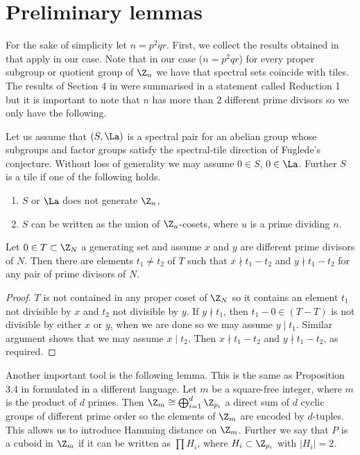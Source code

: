         \section{Preliminary lemmas}
        For the sake of simplicity let $n=p^2qr$.
        First, we collect the results obtained in \cite{negyen} that apply in our case. Note that in our case ($n=p^2qr$) for every proper subgroup or quotient group of $\Z_n$ we have that spectral sets coincide with tiles. 
        The results of Section 4 in \cite{negyen} were summarised in a statement called Reduction 1 but it is important to note that $n$ has more than $2$ different prime divisors so we only have the following. 
        \begin{prop}\label{propreduction}
        Let us assume that $(S,\La)$ is a spectral pair for an abelian group whose subgroups and factor groups satisfy the spectral-tile direction of Fuglede's conjecture. Without loss of generality we may assume $0 \in S$, $0 \in \La$. Further $S$ is a tile if one of the following holds. 
        \begin{enumerate}
            \item\label{itemreductiona} $S$ or $\La$ does not generate $\Z_n$, 
            \item\label{itemreductionb} $S$ can be written as the union of $\Z_u$-cosets, where $u$ is a prime dividing $n$.
        \end{enumerate}
        \end{prop}
        \begin{lem}\label{lempqnemoszt}
        Let $0 \in T \subset \Z_N$ a generating set and assume $x$ and $y$ are different prime divisors of $N$. Then there are elements $t_1 \ne t_2$ of $T$ such that $x \nmid t_1-t_2$ and $y \nmid t_1-t_2$ for any pair of prime divisors of $N$.
        \end{lem}
        \begin{proof}
        $T$ is not contained in any proper coset of $\Z_N$ so it contains an element $t_1$ not divisible by $x$ and $t_2$ not divisible by $y$. If $y \nmid t_1$, then $t_1-0 \in (T -T)$ is not divisible by either $x$ or $y$, when we are done so we may assume $y \mid t_1$. 
        Similar argument shows that we may assume $x \mid t_2$. Then $x \nmid t_1-t_2$ and $y \nmid t_1-t_2$, as required. 
        \end{proof}
        Another important tool is the following lemma. This is the same as Proposition 3.4 in \cite{negyen} formulated in a different language. Let $m$ be a square-free integer, where $m$ is the product of $d$ primes. Then $\Z_m \cong \bigoplus_{i=1}^d\Z_{p_i}$ a direct sum of $d$ cyclic groups of different  prime order so the elements of $\Z_m$ are encoded by $d$-tuples. This allows us to introduce Hamming distance on $\Z_m$. Further we say that $P$ is a cuboid in $\Z_m$ if it can be written as $\prod H_i$, where $H_i \subset \Z_{p_i}$ with $|H_i|=2$. 
